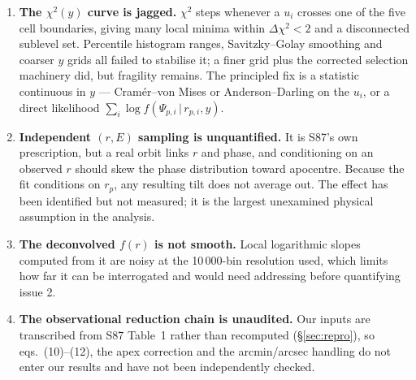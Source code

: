 \documentclass[11pt]{article}
\begin{document}
\begin{enumerate}\itemsep4pt
  \item \textbf{The $\chi^2(y)$ curve is jagged.} $\chi^2$ steps whenever a
        $u_i$ crosses one of the five cell boundaries, giving many local minima
        within $\Delta\chi^2 < 2$ and a disconnected sublevel set. Percentile
        histogram ranges, Savitzky--Golay smoothing and coarser $y$ grids all
        failed to stabilise it; a finer grid plus the corrected selection
        machinery did, but fragility remains. The principled fix is a statistic
        continuous in $y$ --- Cram\'er--von Mises or Anderson--Darling on the
        $u_i$, or a direct likelihood
        $\sum_i \log f(\Psi_{p,i} \,|\, r_{p,i}, y)$.
  \item \textbf{Independent $(r, E)$ sampling is unquantified.} It is S87's own
        prescription, but a real orbit links $r$ and phase, and conditioning on
        an observed $r$ should skew the phase distribution toward apocentre.
        Because the fit conditions on $r_p$, any resulting tilt does not average
        out. The effect has been identified but not measured; it is the largest
        unexamined physical assumption in the analysis.
  \item \textbf{The deconvolved $f(r)$ is not smooth.} Local logarithmic slopes
        computed from it are noisy at the 10\,000-bin resolution used, which
        limits how far it can be interrogated and would need addressing before
        quantifying issue 2.
  \item \textbf{The observational reduction chain is unaudited.} Our inputs are
        transcribed from S87 Table~1 rather than recomputed
        (\S\ref{sec:repro}), so eqs.~(10)--(12), the apex correction and the
        arcmin/arcsec handling do not enter our results and have not been
        independently checked.
\end{enumerate}
\end{document}
